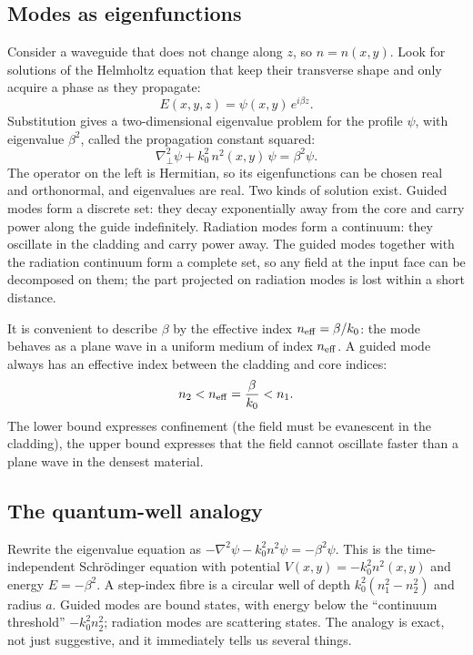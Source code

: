 \documentclass[11pt,a4paper]{article}
\begin{document}
\subsection{Modes as eigenfunctions}
Consider a waveguide that does not change along $z$, so $n = n(x,y)$. Look for solutions of the Helmholtz equation that keep their transverse shape and only acquire a phase as they propagate:
\begin{equation}
E(x,y,z) = \psi(x,y)\, e^{i\beta z}.
\label{eq:mode_ansatz}
\end{equation}
Substitution gives a two-dimensional eigenvalue problem for the profile $\psi$, with eigenvalue $\beta^2$, called the propagation constant squared:
\begin{equation}
\nabla_\perp^2 \psi + k_0^2\, n^2(x,y)\, \psi = \beta^2 \psi.
\label{eq:eigenproblem}
\end{equation}
The operator on the left is Hermitian, so its eigenfunctions can be chosen real and orthonormal, and eigenvalues are real. Two kinds of solution exist. Guided modes form a discrete set: they decay exponentially away from the core and carry power along the guide indefinitely. Radiation modes form a continuum: they oscillate in the cladding and carry power away. The guided modes together with the radiation continuum form a complete set, so any field at the input face can be decomposed on them; the part projected on radiation modes is lost within a short distance.

It is convenient to describe $\beta$ by the effective index $n_{\rm eff} = \beta/k_0$: the mode behaves as a plane wave in a uniform medium of index $n_{\rm eff}$. A guided mode always has an effective index between the cladding and core indices:
\begin{equation}
n_2 < n_{\rm eff} = \frac{\beta}{k_0} < n_1.
\end{equation}
The lower bound expresses confinement (the field must be evanescent in the cladding), the upper bound expresses that the field cannot oscillate faster than a plane wave in the densest material.

\subsection{The quantum-well analogy}
Rewrite the eigenvalue equation as $-\nabla^2\psi - k_0^2 n^2\psi = -\beta^2\psi$. This is the time-independent Schr\"odinger equation with potential $V(x,y) = -k_0^2 n^2(x,y)$ and energy $E = -\beta^2$. A step-index fibre is a circular well of depth $k_0^2(n_1^2 - n_2^2)$ and radius $a$. Guided modes are bound states, with energy below the ``continuum threshold'' $-k_0^2 n_2^2$; radiation modes are scattering states. The analogy is exact, not just suggestive, and it immediately tells us several things.
\end{document}

